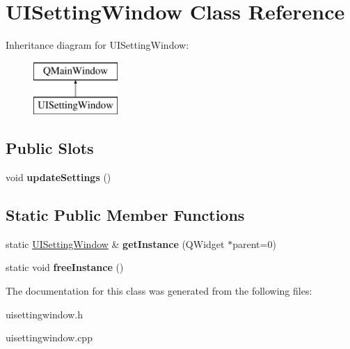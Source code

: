 \hypertarget{class_u_i_setting_window}{}\section{U\+I\+Setting\+Window Class Reference}
\label{class_u_i_setting_window}
Inheritance diagram for U\+I\+Setting\+Window\+:\begin{figure}[H]
\begin{center}
\leavevmode
\includegraphics[height=2.000000cm]{class_u_i_setting_window}
\end{center}
\end{figure}
\subsection*{Public Slots}
\begin{DoxyCompactItemize}
\item 
void {\bfseries update\+Settings} ()\hypertarget{class_u_i_setting_window_a5316560297ed2a9d35c5a3f6e8c73181}{}\label{class_u_i_setting_window_a5316560297ed2a9d35c5a3f6e8c73181}

\end{DoxyCompactItemize}
\subsection*{Static Public Member Functions}
\begin{DoxyCompactItemize}
\item 
static \hyperlink{class_u_i_setting_window}{U\+I\+Setting\+Window} \& {\bfseries get\+Instance} (Q\+Widget $\ast$parent=0)\hypertarget{class_u_i_setting_window_aa07c89acbe2f24d6b7c96907c37862c5}{}\label{class_u_i_setting_window_aa07c89acbe2f24d6b7c96907c37862c5}

\item 
static void {\bfseries free\+Instance} ()\hypertarget{class_u_i_setting_window_a9a086ccff134b7cfaf906bcbc62a3bf0}{}\label{class_u_i_setting_window_a9a086ccff134b7cfaf906bcbc62a3bf0}

\end{DoxyCompactItemize}


The documentation for this class was generated from the following files\+:\begin{DoxyCompactItemize}
\item 
uisettingwindow.\+h\item 
uisettingwindow.\+cpp\end{DoxyCompactItemize}
